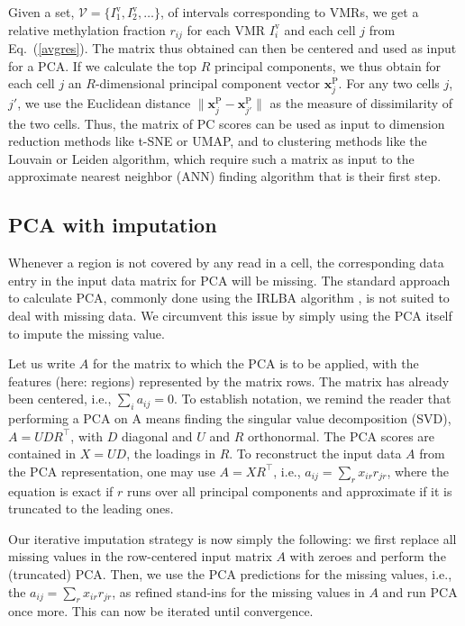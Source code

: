 \documentclass[twocolumn,10pt]{article}
\begin{document}
Given a set, $\mathcal{V}=\{I^\text{v}_1,I^\text{v}_2,\dots\}$, of intervals corresponding to VMRs, we get a relative methylation fraction $r_{ij}$ for each VMR $I^\text{v}_i$ and each cell $j$ from Eq.\ (\ref{avgres}).
The matrix thus obtained can then be centered and used as input for a PCA.
If we calculate the top $R$ principal components, we thus obtain for each cell $j$ an $R$-dimensional principal component vector $\mathbf{x}^\text{P}_j$.
For any two cells $j$, $j'$, we use the Euclidean distance $\|\mathbf{x}^\text{P}_j - \mathbf{x}^\text{P}_{j'}\|$ as the measure of dissimilarity of the two cells.
Thus, the matrix of PC scores can be used as input to dimension reduction methods like t-SNE or UMAP, and to clustering methods like the Louvain or Leiden algorithm, which require such a matrix as input to the approximate nearest neighbor (ANN) finding algorithm that is their first step.

\subsection{PCA with imputation}

Whenever a region is not covered by any read in a cell, the corresponding data entry in the input data matrix for PCA will be missing.
The standard approach to calculate PCA, commonly done using the IRLBA algorithm \citep{Baglama2005}, is not suited to deal with missing data.
We circumvent this issue by simply using the PCA itself to impute the missing value.

Let us write $A$ for the matrix to which the PCA is to be applied, with the features (here: regions) represented by the matrix rows.
The matrix has already been centered, i.e., $\sum_i a_{ij}=0$.
To establish notation, we remind the reader that performing a PCA on A means finding the singular value decomposition (SVD), $A=UDR^\top$, with $D$ diagonal and $U$ and $R$ orthonormal.
The PCA scores are contained in $X=UD$, the loadings in $R$.
To reconstruct the input data $A$ from the PCA representation, one may use $A=XR^\top$, i.e., $a_{ij}=\sum_r x_{ir} r_{jr}$, where the equation is exact if $r$ runs over all principal components and approximate if it is truncated to the leading ones.

Our iterative imputation strategy is now simply the following: we first replace all missing values in the row-centered input matrix $A$ with zeroes and perform the (truncated) PCA.
Then, we use the PCA predictions for the missing values, i.e., the $a_{ij}=\sum_r x_{ir} r_{jr}$, as refined stand-ins for the missing values in $A$ and run PCA once more.
This can now be iterated until convergence.
\end{document}
